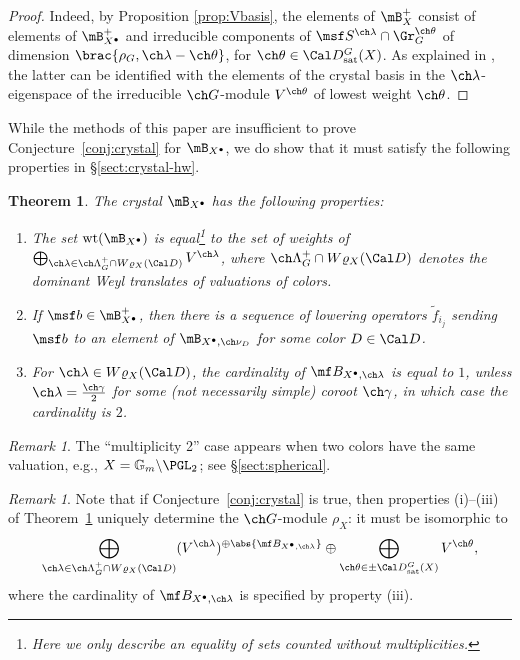 \documentclass[final]{amsart}
\newtheorem{thm}[subsubsection]{Theorem}
\theoremstyle{remark}
\newtheorem{rem}[subsubsection]{Remark}
\theoremstyle{definition}
\numberwithin{equation}{section}
\begin{document}
\begin{proof}
 Indeed, by Proposition \ref{prop:Vbasis}, the elements of $\mB_X^+$ consist of elements of $\mB_{X^\bullet}^+$ and irreducible components of $\msf S^{\ch\lambda} \cap \Gr_G^{\ch\theta}$
of dimension $\brac{\rho_G,\ch\lambda-\ch\theta}$, for $\ch\theta \in \Cal D^G_{\mathrm{sat}}(X)$.
As explained in \cite{BGcrys}, the latter can be identified with the elements of
the crystal basis in the $\ch\lambda$-eigenspace of the irreducible $\ch G$-module $V^{\ch\theta}$ of lowest weight $\ch\theta$.
\end{proof}

While the methods of this paper are insufficient to prove Conjecture~\ref{conj:crystal} 
for $\mB_{X^\bullet}$, we do show that it must satisfy the following properties
in \S\ref{sect:crystal-hw}. 


\begin{thm} \label{thm:crystal-properties}
The crystal $\mB_{X^\bullet}$ has the following properties: 
\begin{enumerate}
\item The set $\mathrm{wt}(\mB_{X^\bullet})$ is equal\footnote{Here we only describe an equality of sets counted without multiplicities.} to the set of weights of 
$\bigoplus_{\ch\lambda \in \ch\Lambda^+_G \cap W\varrho_X(\Cal D)} V^{\ch\lambda}$, 
where $\ch\Lambda^+_G \cap W\varrho_X(\Cal D)$ denotes the dominant Weyl translates of valuations
of colors.  
\item If $\msf b \in \mB_{X^\bullet}^+$, then 
there is a sequence of lowering operators $\tilde f_{i_j}$ sending $\msf b$ to an element of 
$\mB_{X^\bullet,\ch\nu_D}$ for some color $D\in \Cal D$.
\item For $\ch\lambda \in W\varrho_X(\Cal D)$,
the cardinality of $\mf B_{X^\bullet,\ch\lambda}$ is equal to $1$, unless $\ch\lambda =\frac{\ch\gamma}{2}$ for some (not necessarily simple) coroot $\ch\gamma$, in which case the cardinality is $2$. 
\end{enumerate}
\end{thm}



\begin{rem}
 The ``multiplicity 2'' case appears when two colors have the same valuation, e.g., $X = \mathbb G_m\backslash\PGL_2$; see \S \ref{sect:spherical}.
\end{rem}



\begin{rem} \label{rem:conj}
Note that if Conjecture~\ref{conj:crystal} is true, then properties (i)--(iii) of 
Theorem~\ref{thm:crystal-properties} uniquely determine the $\ch G$-module $\rho_X$: it must 
be isomorphic to 
\begin{equation} \label{e:conjVX}
 \bigoplus_{\ch\lambda \in \ch\Lambda^+_G \cap W\varrho_X(\Cal D)} 
(V^{\ch\lambda})^{\oplus \abs{\mf B_{X^\bullet,\ch\lambda}}} \oplus 
\bigoplus_{\ch\theta \in \pm\Cal D^G_{\mathrm{sat}}(X)} V^{\ch\theta},
\end{equation}
where the cardinality of $\mf B_{X^\bullet,\ch\lambda}$ is specified by property (iii).
\end{rem}
\end{document}
